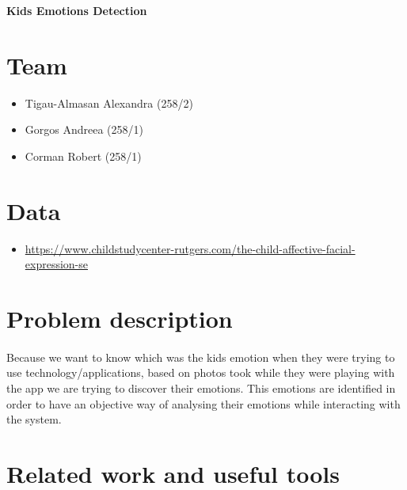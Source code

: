 \documentclass[a4paper,12pt]{article}
\begin{document}
    \renewcommand{\refname}{Bibliography}

    \begin{center}
        \huge
        \textbf{Kids Emotions Detection}
        \normalsize
    \end{center}

    \section*{Team}
    \begin{itemize}
        \item Tigau-Almasan Alexandra (258/2)
        \item Gorgos Andreea (258/1)
        \item Corman Robert (258/1)
    \end{itemize}

    \section*{Data}

    \begin{itemize}
        \item \url{https://www.childstudycenter-rutgers.com/the-child-affective-facial-expression-se}
    \end{itemize}

    \section*{Problem description}
    \paragraph{}
    Because we want to know which was the kids emotion when they were trying to use technology/applications,
    based on photos took while they were playing with the app we are trying to discover their emotions. This 
    emotions are identified in order to have an objective way of analysing their emotions while interacting with the system. 

    \section*{Related work and useful tools}
\end{document}
